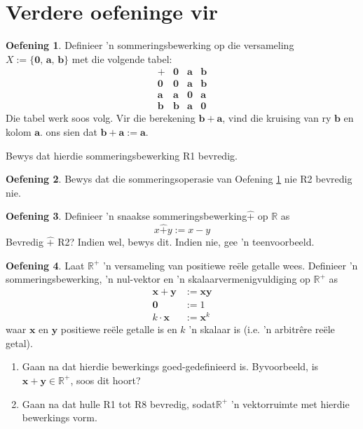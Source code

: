 \documentclass[a4paper,11pt]{book}
\theoremstyle{definition}
\newtheorem{exercise}{Oefening}
\newcommand{\ve}[1]{\mathbf{#1}}
\newcommand{\furtherexercises}{\section*{Verdere oefeninge vir
\thesection}}
\begin{document}
\furtherexercises
\begin{exercise} \label{non_ass_ex} Definieer 'n sommeringsbewerking op die
	versameling $X := \{ \ve{0}, \, \ve{a}, \, \ve{b} \}$ met die volgende
	tabel:
	\[
		\begin{array}{c|ccc}
			+ & \ve{0} & \ve{a} & \ve{b} \\
			\hline
			\ve{0} & \ve{0} & \ve{a} & \ve{b} \\
			\ve{a} & \ve{a} & \ve{0} & \ve{a} \\
			\ve{b} & \ve{b} & \ve{a} & \ve{0}
		\end{array}
	\]
	Die tabel werk soos volg. Vir die berekening  $\ve{b} + \ve{a}$, vind
	die kruising van ry $\ve{b}$ en kolom $\ve{a}$. ons sien dat  $\ve{b} +
	\ve{a} := \ve{a}$.

	Bewys dat hierdie sommeringsbewerking R1 bevredig.
\end{exercise}

\begin{exercise} Bewys dat die sommeringsoperasie van Oefening
	\ref{non_ass_ex} nie R2 bevredig nie.
\end{exercise}

\begin{exercise} Definieer 'n snaakse sommeringsbewerking$\hat{+}$ op
	$\mathbb{R}$ as
	\[
		x \hat{+} y := x - y
	\]
	Bevredig $\hat{+}$ R2? Indien wel, bewys dit. Indien nie, gee 'n
	teenvoorbeeld.
\end{exercise}

\begin{exercise} Laat $\mathbb{R}^+$ 'n versameling van positiewe re{\"e}le
	getalle wees. Definieer 'n sommeringsbewerking, 'n nul-vektor en 'n
	skalaarvermenigvuldiging op $\mathbb{R}^+$ as
	\begin{align*}
		\ve{x} + \ve{y} &:= \ve{x} \ve{y} \\
		\ve{0} & := 1 \\
		k \cdot \ve{x} &:= \ve{x}^k
	\end{align*}
	waar $\ve{x}$ en $\ve{y}$ positiewe re{\"e}le getalle is en $k$ 'n
	skalaar is (i.e. 'n arbitr{\^e}re re{\"e}le getal).
	\begin{enumerate}
		\item Gaan na dat hierdie bewerkings goed-gedefinieerd is.
			Byvoorbeeld, is $\ve{x} + \ve{y} \in \mathbb{R}^+$, soos dit
			hoort?
		\item Gaan na dat hulle R1 tot R8 bevredig, sodat$\mathbb{R}^+$ 'n
			vektorruimte met hierdie bewerkings vorm.
	\end{enumerate}
\end{exercise}
\end{document}
